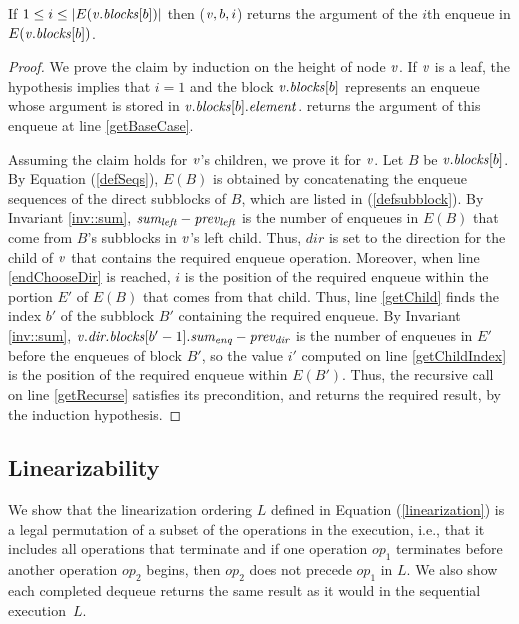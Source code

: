 \begin{lemma}\label{lem::get}
If $1\leq i\leq |E(\mbox{\textnormal{\textit{v}}}.\mbox{\textit{blocks}}[b])|$ then ($\mbox{\textnormal{\textit{v}}},b,i$) returns the argument of the $i$th enqueue in $E(\mbox{\textnormal{\textit{v}}}.\mbox{\textit{blocks}}[b])$.
\end{lemma}

\begin{proof}
We prove the claim by induction on the height of node $\mbox{\textnormal{\textit{v}}}$.
If $\mbox{\textnormal{\textit{v}}}$ is a leaf, the hypothesis implies that $i=1$ and the block $\mbox{\textnormal{\textit{v}}}.\mbox{\textit{blocks}}[b]$ represents 
an enqueue whose argument is stored in $\mbox{\textnormal{\textit{v}}}.\mbox{\textit{blocks}}[b].\mbox{\textit{element}}$.
 returns the argument of this enqueue at line \ref{getBaseCase}.

Assuming the claim holds for $\mbox{\textnormal{\textit{v}}}$'s children, we prove it for $\mbox{\textnormal{\textit{v}}}$.
Let $B$ be $\mbox{\textnormal{\textit{v}}}.\mbox{\textit{blocks}}[b]$.
By Equation (\ref{defSeqs}),
$E(B)$ is obtained by concatenating the enqueue sequences of the direct subblocks
of $B$, which are listed in (\ref{defsubblock}).
By Invariant \ref{inv::sum}, $\mbox{\textnormal{\textit{sum\textsubscript{left}}}}-\mbox{\textnormal{\textit{prev\textsubscript{left}}}}$ is the number
of enqueues in $E(B)$ that come from $B$'s subblocks in $\mbox{\textnormal{\textit{v}}}$'s left child.
Thus, $dir$ is set to the direction for the child of $\mbox{\textnormal{\textit{v}}}$ that contains the required enqueue operation.
Moreover, when line \ref{endChooseDir} is reached, $i$ is the position of the required enqueue within the portion $E'$ of $E(B)$ that comes from that child.
Thus,  line \ref{getChild} finds the index $b'$ of the subblock $B'$ containing the required enqueue.
By Invariant \ref{inv::sum}, $\mbox{\textnormal{\textit{v}}}.\mbox{\textnormal{\textit{dir.blocks}}}[b'-1].\mbox{\textnormal{\textit{sum\textsubscript{enq}}}} - \mbox{\textnormal{\textit{prev\textsubscript{dir}}}}$ is the number of 
enqueues in $E'$ before the enqueues of block $B'$, so
the value $i'$ computed on line \ref{getChildIndex} is the position of the required enqueue within $E(B')$.
Thus, the recursive call on line \ref{getRecurse} satisfies its precondition, and 
returns the required result, by the induction hypothesis.
\end{proof}

\subsection{Linearizability}
\label{sec::linearizability}

We show that the linearization ordering $L$ defined in Equation
(\ref{linearization}) is a legal permutation of a subset of the operations in 
the execution, i.e., that it includes all operations that terminate and 
if one operation $op_1$ terminates before another operation $op_2$ begins, then $op_2$ does not precede $op_1$ in $L$.  We also show each completed dequeue returns the same result as it would in the sequential execution~$L$.

